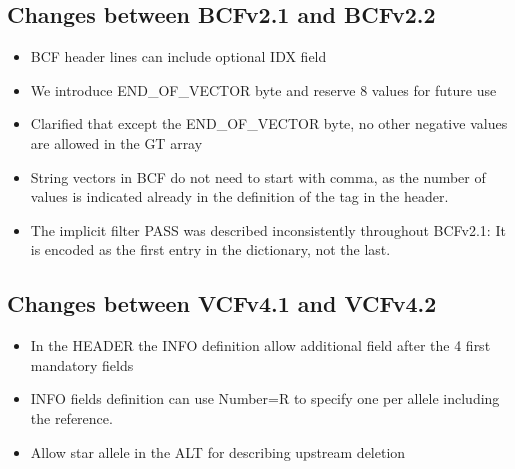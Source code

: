 \documentclass[8pt]{article}
\begin{document}
\subsection{Changes between BCFv2.1 and BCFv2.2}
\begin{itemize}
\item BCF header lines can include optional IDX field
\item We introduce END\_OF\_VECTOR byte and reserve 8 values for future use
\item Clarified that except the END\_OF\_VECTOR byte, no other negative values are allowed in the GT array
\item String vectors in BCF do not need to start with comma, as the number of values is indicated already in the definition of the tag in the header.
\item The implicit filter PASS was described inconsistently throughout BCFv2.1: It is encoded as the first entry in the dictionary, not the last.
\end{itemize}

\subsection{Changes between VCFv4.1 and VCFv4.2}
\begin{itemize}
\item In the HEADER the INFO definition allow additional field after the 4 first mandatory fields
\item INFO fields definition can use Number=R to specify one per allele including the reference.
\item Allow star allele in the ALT for describing upstream deletion
\end{itemize}
\end{document}
